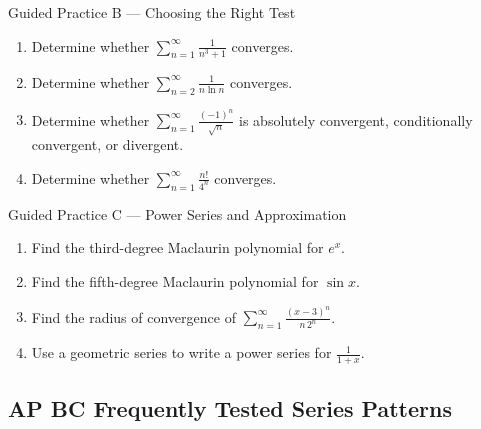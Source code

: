 \documentclass[11pt]{article}
\begin{document}
\begin{practicebox}{Guided Practice B --- Choosing the Right Test}
\begin{enumerate}
    \item Determine whether \(\sum_{n=1}^{\infty}\frac{1}{n^3+1}\) converges.
    \item Determine whether \(\sum_{n=2}^{\infty}\frac{1}{n\ln n}\) converges.
    \item Determine whether \(\sum_{n=1}^{\infty}\frac{(-1)^n}{\sqrt n}\) is absolutely convergent, conditionally convergent, or divergent.
    \item Determine whether \(\sum_{n=1}^{\infty}\frac{n!}{4^n}\) converges.
\end{enumerate}
\end{practicebox}

\begin{practicebox}{Guided Practice C --- Power Series and Approximation}
\begin{enumerate}
    \item Find the third-degree Maclaurin polynomial for \(e^x\).
    \item Find the fifth-degree Maclaurin polynomial for \(\sin x\).
    \item Find the radius of convergence of \(\sum_{n=1}^{\infty}\frac{(x-3)^n}{n\,2^n}\).
    \item Use a geometric series to write a power series for \(\frac{1}{1+x}\).
\end{enumerate}
\end{practicebox}

\newpage
\newpage
\subsection{AP BC Frequently Tested Series Patterns}
\end{document}
